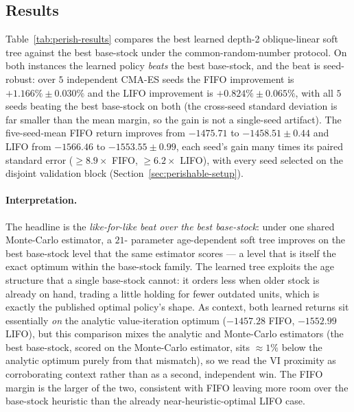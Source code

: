 \documentclass[11pt]{article}
\begin{document}
\subsection{Results}
\label{sec:perishable-results}

Table~\ref{tab:perish-results} compares the best learned depth-2 oblique-linear soft tree against the
best base-stock under the common-random-number protocol. On both instances the learned policy
\emph{beats} the best base-stock, and the beat is seed-robust: over $5$ independent CMA-ES seeds the FIFO
improvement is $+1.166\%\pm0.030\%$ and the LIFO improvement is $+0.824\%\pm0.065\%$, with all $5$
seeds beating the best base-stock on both (the cross-seed standard deviation is far smaller than the mean
margin, so the gain is not a single-seed artifact). The five-seed-mean FIFO return improves
from $-1475.71$ to $-1458.51\pm0.44$ and LIFO from $-1566.46$ to $-1553.55\pm0.99$, each seed's gain
many times its paired standard error ($\ge8.9\times$ FIFO, $\ge6.2\times$ LIFO), with every seed
selected on the disjoint validation block
(Section~\ref{sec:perishable-setup}).

\paragraph{Interpretation.}
The headline is the \emph{like-for-like beat over the best base-stock}: under one shared Monte-Carlo estimator, a $21$-
parameter age-dependent soft tree improves on the best base-stock level that the same estimator scores
--- a level that is itself the exact optimum within the base-stock family. The learned tree exploits
the age structure that a single base-stock cannot: it orders less when older stock is already on hand,
trading a little holding for fewer outdated units, which is exactly the published optimal policy's
shape. As context, both learned returns sit essentially \emph{on} the analytic value-iteration optimum
($-1457.28$ FIFO, $-1552.99$ LIFO), but this comparison mixes the analytic and Monte-Carlo estimators
(the best base-stock, scored on the Monte-Carlo estimator, sits $\approx1\%$ below the analytic optimum purely
from that mismatch), so we read the VI proximity as corroborating context rather than as a second,
independent win. The FIFO margin is the larger of the two, consistent with FIFO leaving more room over
the base-stock heuristic than the already near-heuristic-optimal LIFO case.
\end{document}
